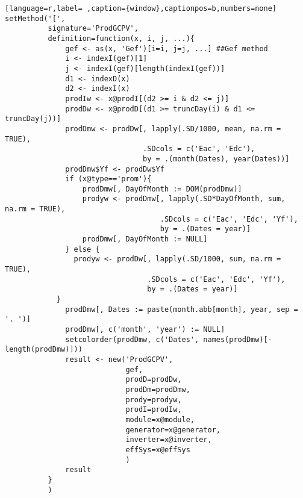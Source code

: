 \begin{lstlisting}[language=r,label= ,caption={window},captionpos=b,numbers=none]
setMethod('[',
          signature='ProdGCPV',
          definition=function(x, i, j, ...){
              gef <- as(x, 'Gef')[i=i, j=j, ...] ##Gef method
              i <- indexI(gef)[1]
              j <- indexI(gef)[length(indexI(gef))]
              d1 <- indexD(x)
              d2 <- indexI(x)
              prodIw <- x@prodI[(d2 >= i & d2 <= j)]
              prodDw <- x@prodD[(d1 >= truncDay(i) & d1 <= truncDay(j))]
              prodDmw <- prodDw[, lapply(.SD/1000, mean, na.rm = TRUE),
                                .SDcols = c('Eac', 'Edc'),
                                by = .(month(Dates), year(Dates))]
              prodDmw$Yf <- prodDw$Yf
              if (x@type=='prom'){
                  prodDmw[, DayOfMonth := DOM(prodDmw)]
                  prodyw <- prodDmw[, lapply(.SD*DayOfMonth, sum, na.rm = TRUE),
                                    .SDcols = c('Eac', 'Edc', 'Yf'),
                                    by = .(Dates = year)]
                  prodDmw[, DayOfMonth := NULL]
              } else {
                prodyw <- prodDw[, lapply(.SD/1000, sum, na.rm = TRUE),
                                 .SDcols = c('Eac', 'Edc', 'Yf'),
                                 by = .(Dates = year)]
            }
              prodDmw[, Dates := paste(month.abb[month], year, sep = '. ')]
              prodDmw[, c('month', 'year') := NULL]
              setcolorder(prodDmw, c('Dates', names(prodDmw)[-length(prodDmw)]))
              result <- new('ProdGCPV',
                            gef,
                            prodD=prodDw,
                            prodDm=prodDmw,
                            prody=prodyw,
                            prodI=prodIw,
                            module=x@module,
                            generator=x@generator,
                            inverter=x@inverter,
                            effSys=x@effSys
                            )
              result
          }
          )


\end{lstlisting}
